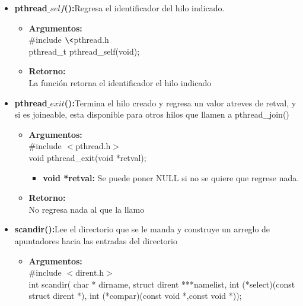 \documentclass[12pt]{article}
\begin{document}
\begin{enumerate}
\begin{itemize}
            \item \textbf{pthread$\_self$():}Regresa el identificador del hilo indicado.\\
            \begin{itemize}
                \item \textbf{Argumentos:}\\
                #include $\<$pthread.h$\>$\\
                pthread\_t pthread\_self(void);\\
                \item \textbf{Retorno:}\\
                La función retorna el identificador el hilo indicado
            \end{itemize}
            \item \textbf{pthread$\_exit$():}Termina el hilo creado y regresa un valor atreves de retval, y si es joineable, esta disponible para otros hilos que llamen a pthread\_join()\\
            \begin{itemize}
                \item \textbf{Argumentos:}\\
                #include $<$pthread.h$>$\\
                void pthread\_exit(void *retval);
                \begin{itemize}
                    \item \textbf{void *retval:} Se puede poner NULL si no se quiere que regrese nada.
                \end{itemize}
                \item \textbf{Retorno:}\\
                No regresa nada al que la llamo
            \end{itemize}
            \item \textbf{scandir():}Lee el directorio que se le manda y construye un arreglo de apuntadores hacia las entradas del directorio
            \begin{itemize}
                \item \textbf{Argumentos:}\\
                 #include $<$dirent.h$>$\\
                int scandir( char * dirname, struct dirent ***namelist, int (*select)(const struct dirent *),
             int (*compar)(const void *,const void *));
             \begin{itemize}

\end{itemize}
\end{itemize}
\end{itemize}
\end{enumerate}
\end{document}
